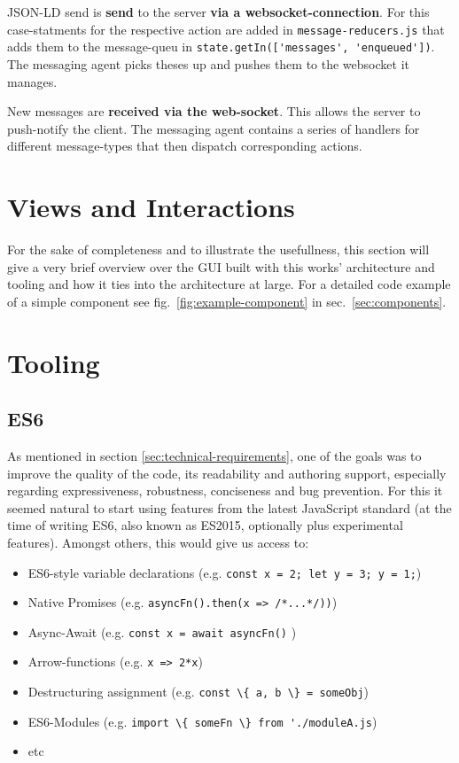 \documentclass[a4paper,,tablecaptionabove]{scrbook}
\newcommand{\passthrough}[1]{#1}
\providecommand{\tightlist}{%
  \setlength{\itemsep}{0pt}\setlength{\parskip}{0pt}}
\begin{document}
JSON-LD send is \textbf{send} to the server \textbf{via a
websocket-connection}. For this case-statments for the respective action
are added in \passthrough{\lstinline!message-reducers.js!} that adds
them to the message-queu in
\passthrough{\lstinline!state.getIn(['messages', 'enqueued'])!}. The
messaging agent picks theses up and pushes them to the websocket it
manages.

New messages are \textbf{received via the web-socket}. This allows the
server to push-notify the client. The messaging agent contains a series
of handlers for different message-types that then dispatch corresponding
actions.

\hypertarget{views-and-interactions}{%
\section{Views and Interactions}\label{views-and-interactions}}

For the sake of completeness and to illustrate the usefullness, this
section will give a very brief overview over the GUI built with this
works' architecture and tooling and how it ties into the architecture at
large. For a detailed code example of a simple component see
fig.~\ref{fig:example-component} in sec.~\ref{sec:components}.

\hypertarget{sec:tooling}{%
\section{Tooling}\label{sec:tooling}}

\hypertarget{sec:es6}{%
\subsection{ES6}\label{sec:es6}}

As mentioned in section \ref{sec:technical-requirements}, one of the
goals was to improve the quality of the code, its readability and
authoring support, especially regarding expressiveness, robustness,
conciseness and bug prevention. For this it seemed natural to start
using features from the latest JavaScript standard (at the time of
writing ES6, also known as ES2015, optionally plus experimental
features). Amongst others, this would give us access to:

\begin{itemize}
\tightlist
\item
  ES6-style variable declarations (e.g.
  \passthrough{\lstinline!const x = 2; let y = 3; y = 1;!})
\item
  Native Promises (e.g.
  \passthrough{\lstinline!asyncFn().then(x => /*...*/))!})
\item
  Async-Await (e.g. \passthrough{\lstinline!const x = await asyncFn()!}
  )
\item
  Arrow-functions (e.g. \passthrough{\lstinline!x => 2*x!})
\item
  Destructuring assignment (e.g.
  \passthrough{\lstinline!const \{ a, b \} = someObj!})
\item
  ES6-Modules (e.g.
  \passthrough{\lstinline!import \{ someFn \} from './moduleA.js!})
\item
  etc
\end{itemize}
\end{document}
